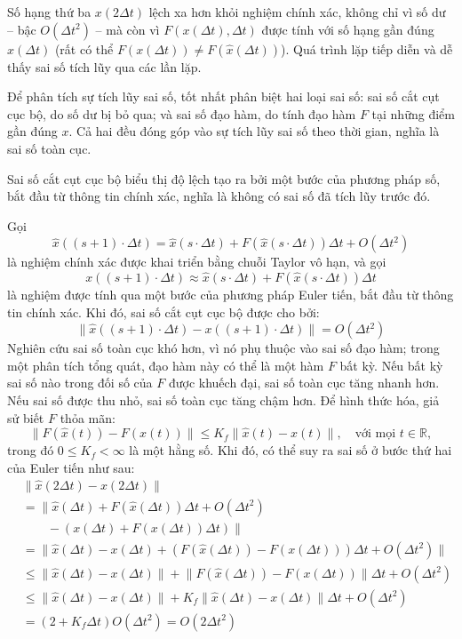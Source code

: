 Số hạng thứ ba $x(2\Delta t)$ lệch xa hơn khỏi nghiệm chính xác, không chỉ vì số dư -- bậc $O(\Delta t^2)$ -- mà còn vì $F(x(\Delta t),\Delta t)$ được tính với số hạng gần đúng $x(\Delta t)$ (rất có thể $F(x(\Delta t))\ne F(\hat x(\Delta t))$). Quá trình lặp tiếp diễn và dễ thấy sai số tích lũy qua các lần lặp.

Để phân tích sự tích lũy sai số, tốt nhất phân biệt hai loại sai số: sai số cắt cụt cục bộ, do số dư bị bỏ qua; và sai số đạo hàm, do tính đạo hàm $F$ tại những điểm gần đúng $x$. Cả hai đều đóng góp vào sự tích lũy sai số theo thời gian, nghĩa là sai số toàn cục.

Sai số cắt cụt cục bộ biểu thị độ lệch tạo ra bởi một bước của phương pháp số, bắt đầu từ thông tin chính xác, nghĩa là không có sai số đã tích lũy trước đó.

Gọi
\begin{equation}\hat x((s+1)\cdot\Delta t)=\hat x(s\cdot\Delta t)+F(\hat x(s\cdot\Delta t))\Delta t+O(\Delta t^2)\tag{4.18}\end{equation}
là nghiệm chính xác được khai triển bằng chuỗi Taylor vô hạn, và gọi
\[x((s+1)\cdot\Delta t)\approx\hat x(s\cdot\Delta t)+F(\hat x(s\cdot\Delta t))\Delta t\]
là nghiệm được tính qua một bước của phương pháp Euler tiến, bắt đầu từ thông tin chính xác. Khi đó, sai số cắt cụt cục bộ được cho bởi:
\begin{equation}\lVert\hat x((s+1)\cdot\Delta t)-x((s+1)\cdot\Delta t)\rVert=O(\Delta t^2)\tag{4.19}\end{equation}
Nghiên cứu sai số toàn cục khó hơn, vì nó phụ thuộc vào sai số đạo hàm; trong một phân tích tổng quát, đạo hàm này có thể là một hàm $F$ bất kỳ. Nếu bất kỳ sai số nào trong đối số của $F$ được khuếch đại, sai số toàn cục tăng nhanh hơn. Nếu sai số được thu nhỏ, sai số toàn cục tăng chậm hơn. Để hình thức hóa, giả sử biết $F$ thỏa mãn:
\begin{equation}\lVert F(\hat x(t))-F(x(t))\rVert\le K_f\lVert\hat x(t)-x(t)\rVert,\quad\text{với mọi }t\in\mathbb R,\tag{4.20}\end{equation}
trong đó $0\le K_f<\infty$ là một hằng số. Khi đó, có thể suy ra sai số ở bước thứ hai của Euler tiến như sau:
\begin{equation}\begin{aligned}
&\lVert\hat x(2\Delta t)-x(2\Delta t)\rVert\\
&=\bigl\lVert\hat x(\Delta t)+F(\hat x(\Delta t))\Delta t+O(\Delta t^2)\\
&\qquad-(x(\Delta t)+F(x(\Delta t))\Delta t)\bigr\rVert\\
&=\bigl\lVert\hat x(\Delta t)-x(\Delta t)+(F(\hat x(\Delta t))-F(x(\Delta t)))\Delta t+O(\Delta t^2)\bigr\rVert\\
&\le\lVert\hat x(\Delta t)-x(\Delta t)\rVert+\lVert F(\hat x(\Delta t))-F(x(\Delta t))\rVert\Delta t+O(\Delta t^2)\\
&\le\lVert\hat x(\Delta t)-x(\Delta t)\rVert+K_f\lVert\hat x(\Delta t)-x(\Delta t)\rVert\Delta t+O(\Delta t^2)\\
&=(2+K_f\Delta t)O(\Delta t^2)=O(2\Delta t^2)
\end{aligned}\tag{4.21}\end{equation}

